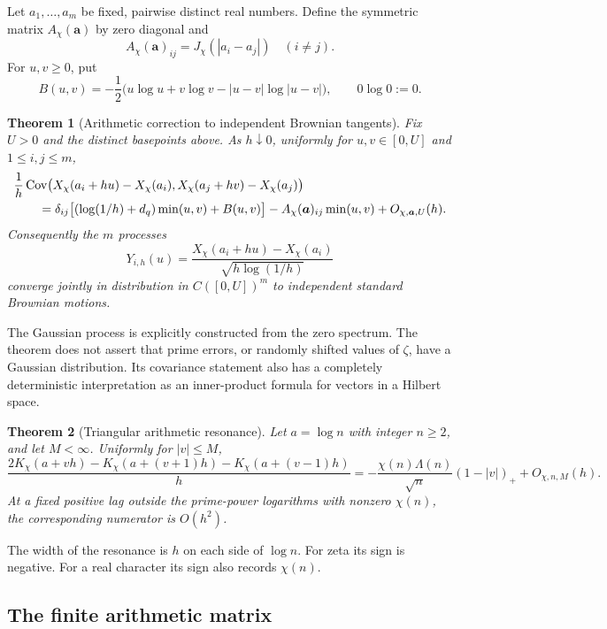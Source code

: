 \documentclass[11pt]{article}
\newtheorem{theorem}{Theorem}[section]
\theoremstyle{definition}
\newcommand{\Cov}{\operatorname{Cov}}
\begin{document}
Let $a_1,\ldots,a_m$ be fixed, pairwise distinct real numbers. Define the symmetric
matrix $A_\chi(\bm a)$ by zero diagonal and
\[
 A_\chi(\bm a)_{ij}=J_\chi(|a_i-a_j|)\quad(i\ne j).
\]
For $u,v\ge0$, put
\begin{equation}\label{eq:B}
 B(u,v)=-\frac12\bigl(u\log u+v\log v-|u-v|\log|u-v|\bigr),
 \qquad 0\log0:=0.
\end{equation}

\begin{theorem}[Arithmetic correction to independent Brownian tangents]\label{thm:tangent}
Fix $U>0$ and the distinct basepoints above. As $h\downarrow0$, uniformly for
$u,v\in[0,U]$ and $1\le i,j\le m$,
\begin{align}\label{eq:maincov}
 &\frac1h\Cov\bigl(X_\chi(a_i+hu)-X_\chi(a_i),
                   X_\chi(a_j+hv)-X_\chi(a_j)\bigr)\notag\\
 &\qquad=\delta_{ij}\bigl[(\log(1/h)+d_q)\min(u,v)+B(u,v)\bigr]
       -A_\chi(\bm a)_{ij}\min(u,v)+O_{\chi,\bm a,U}(h).
\end{align}
Consequently the $m$ processes
\[
 Y_{i,h}(u)=\frac{X_\chi(a_i+hu)-X_\chi(a_i)}{\sqrt{h\log(1/h)}}
\]
converge jointly in distribution in $C([0,U])^m$ to independent standard
Brownian motions.
\end{theorem}

The Gaussian process is explicitly constructed from the zero spectrum. The theorem
does not assert that prime errors, or randomly shifted values of $\zeta$, have a
Gaussian distribution. Its covariance statement also has a completely deterministic
interpretation as an inner-product formula for vectors in a Hilbert space.

\begin{theorem}[Triangular arithmetic resonance]\label{thm:triangle}
Let $a=\log n$ with integer $n\ge2$, and let $M<\infty$. Uniformly for $|v|\le M$,
\begin{equation}\label{eq:triangle}
 \frac{2K_\chi(a+vh)-K_\chi(a+(v+1)h)-K_\chi(a+(v-1)h)}{h}
 =-\frac{\chi(n)\Lambda(n)}{\sqrt n}(1-|v|)_++O_{\chi,n,M}(h).
\end{equation}
At a fixed positive lag outside the prime-power logarithms with nonzero
$\chi(n)$, the corresponding numerator is $O(h^2)$.
\end{theorem}

The width of the resonance is $h$ on each side of $\log n$. For zeta its sign is
negative. For a real character its sign also records $\chi(n)$.

\subsection{The finite arithmetic matrix}
\end{document}
